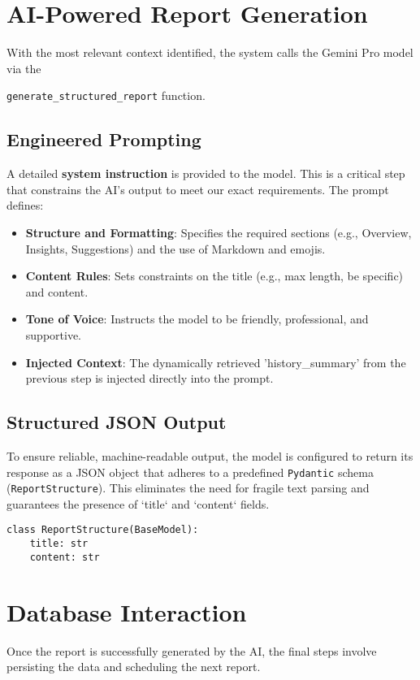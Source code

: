\documentclass{article}
\begin{document}
\hrulefill

\section{AI-Powered Report Generation}
With the most relevant context identified, the system calls the Gemini Pro model via the 

\texttt{generate\_structured\_report} function.

\subsection{Engineered Prompting}
A detailed \textbf{system instruction} is provided to the model. This is a critical step that constrains the AI's output to meet our exact requirements. The prompt defines:
\begin{itemize}[noitemsep]
    \item \textbf{Structure and Formatting}: Specifies the required sections (e.g., Overview, Insights, Suggestions) and the use of Markdown and emojis.
    \item \textbf{Content Rules}: Sets constraints on the title (e.g., max length, be specific) and content.
    \item \textbf{Tone of Voice}: Instructs the model to be friendly, professional, and supportive.
    \item \textbf{Injected Context}: The dynamically retrieved 'history\_summary' from the previous step is injected directly into the prompt.
\end{itemize}

\subsection{Structured JSON Output}
To ensure reliable, machine-readable output, the model is configured to return its response as a JSON object that adheres to a predefined \texttt{Pydantic} schema (\texttt{ReportStructure}). This eliminates the need for fragile text parsing and guarantees the presence of `title` and `content` fields.
\begin{verbatim}
class ReportStructure(BaseModel):
    title: str
    content: str
\end{verbatim}

\hrulefill

\section{Database Interaction}
Once the report is successfully generated by the AI, the final steps involve persisting the data and scheduling the next report.
\end{document}
